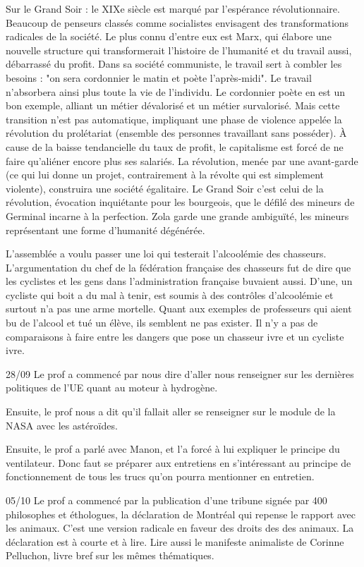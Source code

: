 \documentclass[a4paper,12pt]{book}
\begin{document}
\par Sur le Grand Soir : le XIXe siècle est marqué par l'espérance révolutionnaire. Beaucoup de penseurs classés comme socialistes envisagent des transformations radicales de la société. Le plus connu d'entre eux est Marx, qui élabore une nouvelle structure qui transformerait l'histoire de l'humanité et du travail aussi, débarrassé du profit. Dans sa société communiste, le travail sert à combler les besoins : "on sera cordonnier le matin et poète l'après-midi". Le travail n'absorbera ainsi plus toute la vie de l'individu. Le cordonnier poète en est un bon exemple, alliant un métier dévalorisé et un métier survalorisé. Mais cette transition n'est pas automatique, impliquant une phase de violence appelée la révolution du prolétariat (ensemble des personnes travaillant sans posséder). À cause de la baisse tendancielle du taux de profit, le capitalisme est forcé de ne faire qu'aliéner encore plus ses salariés. La révolution, menée par une avant-garde (ce qui lui donne un projet, contrairement à la révolte qui est simplement violente), construira une société égalitaire. Le Grand Soir c'est celui de la révolution, évocation inquiétante pour les bourgeois, que le défilé des mineurs de Germinal incarne à la perfection. Zola garde une grande ambiguïté, les mineurs représentant une forme d'humanité dégénérée.
\par L'assemblée a voulu passer une loi qui testerait l'alcoolémie des chasseurs. L'argumentation du chef de la fédération française des chasseurs fut de dire que les cyclistes et les gens dans l'administration française buvaient aussi. D'une, un cycliste qui boit a du mal à tenir, est soumis à des contrôles d'alcoolémie et surtout n'a pas une arme mortelle. Quant aux exemples de professeurs qui aient bu de l'alcool et tué un élève, ils semblent ne pas exister. Il n'y a pas de comparaisons à faire entre les dangers que pose un chasseur ivre et un cycliste ivre.
\par 28/09 Le prof a commencé par nous dire d'aller nous renseigner sur les dernières politiques de l'UE quant au moteur à hydrogène.
\par Ensuite, le prof nous a dit qu'il fallait aller se renseigner sur le module de la NASA avec les astéroïdes.
\par Ensuite, le prof a parlé avec Manon, et l'a forcé à lui expliquer le principe du ventilateur. Donc faut se préparer aux entretiens en s'intéressant au principe de fonctionnement de tous les trucs qu'on pourra mentionner en entretien.
\par 05/10 Le prof a commencé par la publication d'une tribune signée par 400 philosophes et éthologues, la déclaration de Montréal qui repense le rapport avec les animaux. C'est une version radicale en faveur des droits des des animaux. La déclaration est à courte et à lire. Lire aussi le manifeste animaliste de Corinne Pelluchon, livre bref sur les mêmes thématiques.
\end{document}
